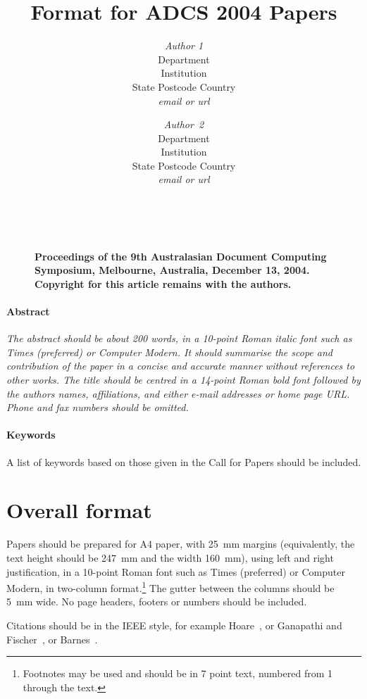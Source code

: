 \documentclass[twocolumn]{article}
\title{Format for ADCS 2004 Papers}
\author{{\em Author 1}\\[1ex]
        Department\\Institution\\State Postcode Country\\[1ex]
        {\em email or url} \and
        {\em Author~2}\\[1ex]
        Department\\Institution\\State Postcode Country\\[1ex]
        {\em email or url}}
\date{}
\begin{document}
\maketitle
\thispagestyle{empty}


        \begin{figure}[b]
	~\\
        \noindent
        {\small\raggedright\bf
        Proceedings of the 9th Australasian 
	Document Computing Symposium,
	Melbourne, Australia,
        December 13, 2004.
	Copyright for this article remains with the authors.
        }
        \end{figure}


\paragraph*{Abstract}
\noindent
{\it 
The abstract should be about 200 words, in a 10-point Roman italic
font such as Times (preferred) or Computer Modern.
It should summarise the scope and contribution of the paper in a
concise and accurate manner without references to other works.
The title should be centred in a 14-point Roman bold font followed by
the authors names, affiliations, and either e-mail addresses or home
page URL.
Phone and fax numbers should be omitted.
} 

\paragraph*{Keywords} 
A list of keywords based on those given in the Call for Papers should be included.


\section{Overall format}

Papers should be prepared for A4 paper, with 25~mm margins
(equivalently, the text height should be 247~mm and the width
160~mm), using left and right justification, in a 10-point Roman font
such as Times (preferred) or Computer Modern, in two-column
format.\footnote{Footnotes may be used and should be in 7 point text,
numbered from 1 through the text.}
The gutter between the columns should be 5~mm wide.
No page headers, footers or numbers should be included.

Citations should be in the IEEE style, for example
Hoare~\cite{Hoare73}, or Ganapathi and
Fischer~\cite{GanapathiFischer82}, or 
Barnes~\cite{Barnes80,Barnes89}.
\end{document}
